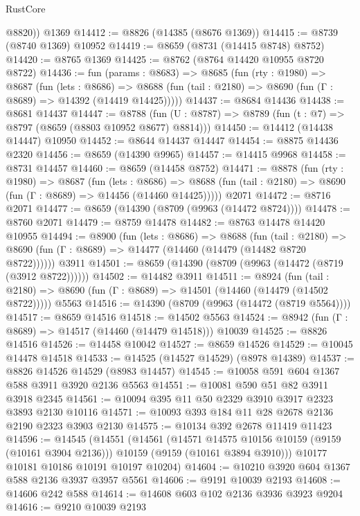 \begin{lexlean}{RustCore}
\begin{coremodule}
        @8820))
    @1369
@14412 := @8826 (@14385 (@8676 @1369))
@14415 := @8739 (@8740 @1369) @10952
@14419 := @8659 (@8731 (@14415 @8748) @8752)
@14420 := @8765 @1369
@14425 := @8762 (@8764 @14420 @10955 @8720 @8722)
@14436 := fun (params : @8683) =>
  @8685
    (fun (rty : @1980) =>
    @8687
      (fun (lets : @8686) =>
      @8688 (fun (tail : @2180) => @8690 (fun (Γ : @8689) => @14392 (@14419 @14425)))))
@14437 := @8684 @14436
@14438 := @8681 @14437
@14447 := @8788
    (fun (U : @8787) => @8789 (fun (t : @7) => @8797 (@8659 (@8803 @10952 @8677) @8814)))
@14450 := @14412 (@14438 @14447) @10950
@14452 := @8644 @14437 @14447
@14454 := @8875 @14436 @2320
@14456 := @8659 (@14390 @9965)
@14457 := @14415 @9968
@14458 := @8731 @14457
@14460 := @8659 (@14458 @8752)
@14471 := @8878
    (fun (rty : @1980) =>
    @8687
      (fun (lets : @8686) =>
      @8688 (fun (tail : @2180) => @8690 (fun (Γ : @8689) => @14456 (@14460 @14425)))))
    @2071
@14472 := @8716 @2071
@14477 := @8659 (@14390 (@8709 (@9963 (@14472 @8724))))
@14478 := @8760 @2071
@14479 := @8759 @14478
@14482 := @8763 @14478 @14420 @10955
@14494 := @8900
    (fun (lets : @8686) =>
    @8688
      (fun (tail : @2180) =>
      @8690 (fun (Γ : @8689) => @14477 (@14460 (@14479 (@14482 @8720 @8722))))))
    @3911
@14501 := @8659 (@14390 (@8709 (@9963 (@14472 (@8719 (@3912 @8722))))))
@14502 := @14482 @3911
@14511 := @8924
    (fun (tail : @2180) => @8690 (fun (Γ : @8689) => @14501 (@14460 (@14479 (@14502 @8722)))))
    @5563
@14516 := @14390 (@8709 (@9963 (@14472 (@8719 @5564))))
@14517 := @8659 @14516
@14518 := @14502 @5563
@14524 := @8942 (fun (Γ : @8689) => @14517 (@14460 (@14479 @14518))) @10039
@14525 := @8826 @14516
@14526 := @14458 @10042
@14527 := @8659 @14526
@14529 := @10045 @14478 @14518
@14533 := @14525 (@14527 @14529) (@8978 @14389)
@14537 := @8826 @14526 @14529 (@8983 @14457)
@14545 := @10058 @591 @604 @1367 @588 @3911 @3920 @2136 @5563
@14551 := @10081 @590 @51 @82 @3911 @3918 @2345
@14561 := @10094 @395 @11 @50 @2329 @3910 @3917 @2323 @3893 @2130 @10116
@14571 := @10093 @393 @184 @11 @28 @2678 @2136 @2190 @2323 @3903 @2130
@14575 := @10134 @392 @2678 @11419 @11423
@14596 := @14545
    (@14551
      (@14561
        (@14571 @14575 @10156 @10159 (@9159 (@10161 @3904 @2136)))
        @10159
        (@9159 (@10161 @3894 @3910)))
      @10177
      @10181
      @10186
      @10191
      @10197
      @10204)
@14604 := @10210 @3920 @604 @1367 @588 @2136 @3937 @3957 @5561
@14606 := @9191 @10039 @2193
@14608 := @14606 @242 @588
@14614 := @14608 @603 @102 @2136 @3936 @3923 @9204
@14616 := @9210 @10039 @2193

\end{coremodule}
\end{lexlean}

